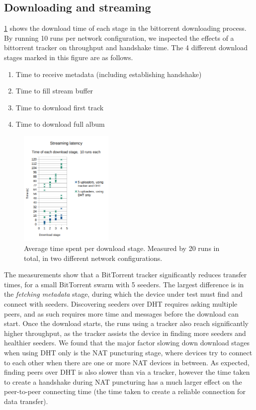 \subsection{Downloading and streaming}
\ref{fig:download-times} shows the download time of each stage in the bittorrent downloading process. By running 10 runs per network configuration, we inspected the effects of a bittorrent tracker on throughput and handshake time. The 4 different download stages marked in this figure are as follows.

\begin{enumerate}
    \item Time to receive metadata (including establishing handshake)
    \item Time to fill stream buffer
    \item Time to download first track
    \item Time to download full album
\end{enumerate}

\begin{figure}
    \centering
    \includegraphics[width=0.4\textwidth]{evaluation/download-times.png}
    \caption{Average time spent per download stage. Measured by 20 runs in total, in two different network configurations.}
    \label{fig:download-times}
\end{figure}

The measurements show that a BitTorrent tracker significantly reduces transfer times, for a small BitTorrent swarm with 5 seeders. The largest difference is in the \textit{fetching metadata} stage, during which the device under test must find and connect with seeders. Discovering seeders over DHT requires asking multiple peers, and as such requires more time and messages before the download can start. Once the download starts, the runs using a tracker also reach significantly higher throughput, as the tracker assists the device in finding more seeders and healthier seeders. We found that the major factor slowing down download stages when using DHT only is the NAT puncturing stage, where devices try to connect to each other when there are one or more NAT devices in between. As expected, finding peers over DHT is also slower than via a tracker, however the time taken to create a handshake during NAT puncturing has a much larger effect on the peer-to-peer connecting time (the time taken to create a reliable connection for data transfer). 

